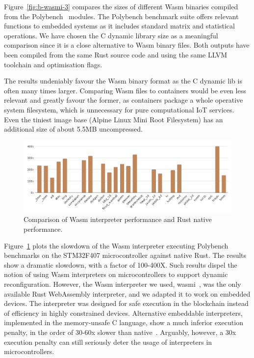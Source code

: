 Figure~\ref{fig:b-wasmi-3} compares the sizes of different Wasm binaries compiled from the Polybench~\cite{yuki2014understanding} modules. The Polybench benchmark suite offers relevant functions to embedded systems as it includes standard matrix and statistical operations. We have chosen the C dynamic library size as a meaningful comparison since it is a close alternative to Wasm binary files. Both outputs have been compiled from the same Rust source code and using the same LLVM toolchain and optimisation flags.

The results undeniably favour the Wasm binary format as the C dynamic lib is often many times larger. Comparing Wasm files to containers would be even less relevant and greatly favour the former, as containers package a whole operative system filesystem, which is unnecessary for pure computational IoT services. Even the tiniest image base (Alpine Linux Mini Root Filesystem) has an additional size of about 5.5MB uncompressed.

\begin{figure}[ht]
\centering
\includegraphics[width=\columnwidth]{figures/b-wasmi-4}
\caption{Comparison of Wasm interpreter performance and Rust native performance.} \label{fig:b-wasmi-4}
\end{figure}

Figure~\ref{fig:b-wasmi-4} plots the slowdown of the Wasm interpreter executing Polybench benchmarks on the STM32F407 microcontroller against native Rust. The results show a dramatic slowdown, with a factor of 100-400X. Such results dispel the notion of using Wasm interpreters on microcontrollers to support dynamic reconfiguration.
However, the Wasm interpreter we used, wasmi~\cite{wasmi}, was the only available Rust WebAssembly interpreter, and we adapted it to work on embedded devices. The interpreter was designed for safe execution in the blockchain instead of efficiency in highly constrained devices. 
Alternative embeddable interpreters, implemented in the memory-unsafe C language, show a much inferior execution penalty, in the order of 30-60x slower than native~\cite{peach2020ewasm}. Arguably, however, a 30x execution penalty can still seriously deter the usage of interpreters in microcontrollers.

